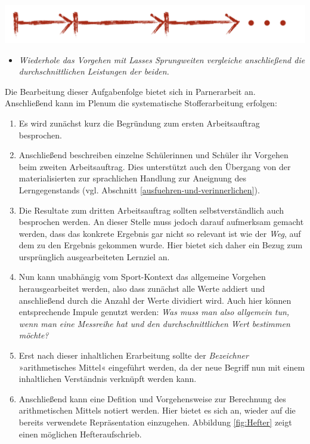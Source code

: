\documentclass[
]{scrbook}
\providecommand{\tightlist}{%
  \setlength{\itemsep}{0pt}\setlength{\parskip}{0pt}}
\theoremstyle{definition}
\theoremstyle{definition}
\theoremstyle{definition}
\theoremstyle{definition}
\theoremstyle{remark}
\begin{document}
\begin{center}\includegraphics[width=0.5\linewidth]{pictures/B-Einfuehrung} \end{center}

\begin{itemize}
\tightlist
\item
  \emph{Wiederhole das Vorgehen mit Lasses Sprungweiten vergleiche anschließend die durchschnittlichen Leistungen der beiden.}
\end{itemize}

Die Bearbeitung dieser Aufgabenfolge bietet sich in Parnerarbeit an. Anschließend kann im Plenum die systematische Stofferarbeitung erfolgen:

\begin{enumerate}
\def\labelenumi{\arabic{enumi}.}
\tightlist
\item
  Es wird zunächst kurz die Begründung zum ersten Arbeitsauftrag besprochen.
\item
  Anschließend beschreiben einzelne Schülerinnen und Schüler ihr Vorgehen beim zweiten Arbeitsauftrag. Dies unterstützt auch den Übergang von der materialisierten zur sprachlichen Handlung zur Aneignung des Lerngegenstands (vgl. Abschnitt \ref{ausfuehren-und-verinnerlichen}).
\item
  Die Resultate zum dritten Arbeitsauftrag sollten selbstverständlich auch besprochen werden. An dieser Stelle muss jedoch darauf aufmerksam gemacht werden, dass das konkrete Ergebnis gar nicht so relevant ist wie der \emph{Weg}, auf dem zu den Ergebnis gekommen wurde. Hier bietet sich daher ein Bezug zum ursprünglich ausgearbeiteten Lernziel an.
\item
  Nun kann unabhängig vom Sport-Kontext das allgemeine Vorgehen herausgearbeitet werden, also dass zunächst alle Werte addiert und anschließend durch die Anzahl der Werte dividiert wird. Auch hier können entsprechende Impule genutzt werden: \emph{Was muss man also allgemein tun, wenn man eine Messreihe hat und den durchschnittlichen Wert bestimmen möchte?}
\item
  Erst nach dieser inhaltlichen Erarbeitung sollte der \emph{Bezeichner} »arithmetisches Mittel« eingeführt werden, da der neue Begriff nun mit einem inhaltlichen Verständnis verknüpft werden kann.
\item
  Anschließend kann eine Defition und Vorgehensweise zur Berechnung des arithmetischen Mittels notiert werden. Hier bietet es sich an, wieder auf die bereits verwendete Repräsentation einzugehen. Abbildung \ref{fig:Hefter} zeigt einen möglichen Hefteraufschrieb.
\end{enumerate}
\end{document}
